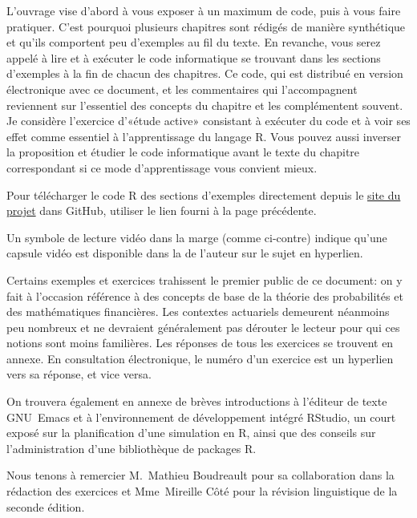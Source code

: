 L'ouvrage vise d'abord à vous exposer à un maximum de code, puis à
vous faire pratiquer. C'est pourquoi plusieurs chapitres sont rédigés
de manière synthétique et qu'ils comportent peu d'exemples au fil du
texte. En revanche, vous serez appelé à lire et à exécuter le code
informatique se trouvant dans les sections d'exemples à la fin de
chacun des chapitres. Ce code, qui est distribué en version
électronique avec ce document, et les commentaires qui l'accompagnent
reviennent sur l'essentiel des concepts du chapitre et les
complémentent souvent. Je considère l'exercice d'«étude active»
consistant à exécuter du code et à voir ses effet comme essentiel à
l'apprentissage du langage R. Vous pouvez aussi inverser la
proposition et étudier le code informatique avant le texte du chapitre
correspondant si ce mode d'apprentissage vous convient mieux.




Pour télécharger le code R des sections d'exemples directement depuis
le \href{https://vigou3.github.io/introduction-programmation-r/}{site
  du projet} dans GitHub, utiliser le lien fourni à la page
précédente.

Un symbole de lecture vidéo dans la marge (comme ci-contre) indique
qu'une capsule vidéo est disponible dans la %
de l'auteur sur le sujet en hyperlien.

Certains exemples et exercices trahissent le premier public de ce
document: on y fait à l'occasion référence à des concepts de base de
la théorie des probabilités et des mathématiques financières. Les
contextes actuariels demeurent néanmoins peu nombreux et ne devraient
généralement pas dérouter le lecteur pour qui ces notions sont moins
familières. Les réponses de tous les exercices se trouvent en annexe.
En consultation électronique, le numéro d'un exercice est un hyperlien
vers sa réponse, et vice versa.

On trouvera également en annexe de brèves introductions à l'éditeur de
texte GNU~Emacs et à l'environnement de développement intégré RStudio,
un court exposé sur la planification d'une simulation en R, ainsi que
des conseils sur l'administration d'une bibliothèque de packages R.

Nous tenons à remercier M.~Mathieu Boudreault pour sa collaboration
dans la rédaction des exercices et Mme~Mireille Côté pour la révision
linguistique de la seconde édition.

